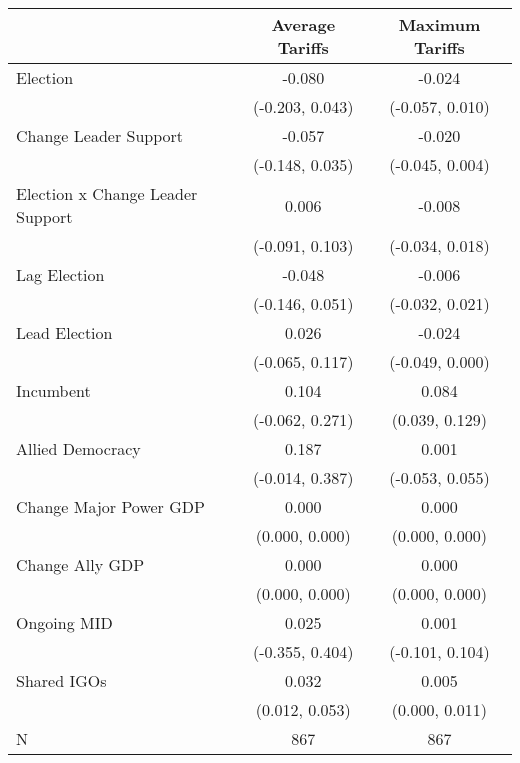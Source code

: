 
\begin{tabular}[t]{lcc}
\toprule
  & Average Tariffs & Maximum Tariffs\\
\midrule
Election & -0.080 & -0.024\\
 & (-0.203, 0.043) & (-0.057, 0.010)\\
Change Leader Support & -0.057 & -0.020\\
 & (-0.148, 0.035) & (-0.045, 0.004)\\
Election x Change Leader Support & 0.006 & -0.008\\
 & (-0.091, 0.103) & (-0.034, 0.018)\\
Lag Election & -0.048 & -0.006\\
 & (-0.146, 0.051) & (-0.032, 0.021)\\
Lead Election & 0.026 & -0.024\\
 & (-0.065, 0.117) & (-0.049, 0.000)\\
Incumbent & 0.104 & 0.084\\
 & (-0.062, 0.271) & (0.039, 0.129)\\
Allied Democracy & 0.187 & 0.001\\
 & (-0.014, 0.387) & (-0.053, 0.055)\\
Change Major Power GDP & 0.000 & 0.000\\
 & (0.000, 0.000) & (0.000, \vphantom{1} 0.000)\\
Change Ally GDP & 0.000 & 0.000\\
 & (0.000, 0.000) & (0.000, 0.000)\\
Ongoing MID & 0.025 & 0.001\\
 & (-0.355, 0.404) & (-0.101, 0.104)\\
Shared IGOs & 0.032 & 0.005\\
 & (0.012, 0.053) & (0.000, 0.011)\\
\midrule
N & 867 & 867\\
\bottomrule
\end{tabular}

